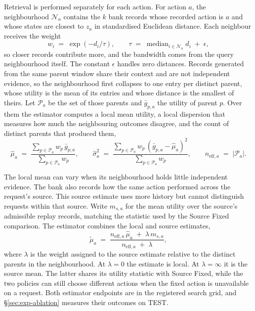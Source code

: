 \documentclass{article}
\newcommand{\calN}{\mathcal{N}}
\newcommand{\calP}{\mathcal{P}}
\begin{document}
Retrieval is performed separately for each action. For action $a$, the neighbourhood
$\calN_a$ contains the $k$ bank records whose recorded action is $a$ and whose states are
closest to $z_a$ in standardised Euclidean distance. Each neighbour receives the weight
\begin{equation}
  w_i \;=\; \exp\!\left(-d_i / \tau\right),
  \qquad
  \tau \;=\; \operatorname{median}_{i \in \calN_a} d_i \;+\; \epsilon ,
  \label{eq:weights}
\end{equation}
so closer records contribute more, and the bandwidth comes from the query neighbourhood
itself. The constant $\epsilon$ handles zero distances. Records generated from the same
parent window share their context and are not independent evidence, so the neighbourhood
first collapses to one entry per distinct parent, whose utility is the mean of its entries and
whose distance is the smallest of theirs. Let $\calP_a$ be the set of those parents and
$\bar g_{p,a}$ the utility of parent $p$. Over them the estimator computes a local mean
utility, a local dispersion that measures how much the neighbouring outcomes disagree, and the
count of distinct parents that produced them,
\begin{equation}
  \hat\mu_a \;=\; \frac{\sum_{p \in \calP_a} w_p\, \bar g_{p,a}}{\sum_{p \in \calP_a} w_p},
  \qquad
  \hat\sigma_a^{2} \;=\; \frac{\sum_{p \in \calP_a} w_p\, (\bar g_{p,a} - \hat\mu_a)^{2}}{\sum_{p \in \calP_a} w_p},
  \qquad
  n_{\mathrm{eff},a} \;=\; \left| \calP_a \right| .
  \label{eq:local-moments}
\end{equation}

The local mean can vary when its neighbourhood holds little independent evidence. The bank
also records how the same action performed across the request's source. This source estimate
uses more history but cannot distinguish requests within that source. Write $m_{s,a}$ for the
mean utility over the source's admissible replay records, matching the statistic used by the
Source Fixed comparison. The estimator combines the local and source estimates,
\begin{equation}
  \tilde\mu_a \;=\; \frac{n_{\mathrm{eff},a}\,\hat\mu_a \;+\; \lambda\, m_{s,a}}
                          {n_{\mathrm{eff},a} \;+\; \lambda} ,
  \label{eq:pooled}
\end{equation}
where $\lambda$ is the weight assigned to the source estimate relative to the distinct
parents in the neighbourhood. At $\lambda=0$ the estimate is local. At
$\lambda=\infty$ it is the source mean. The latter shares its utility statistic with
Source Fixed, while the two policies can still choose different actions when the fixed
action is unavailable on a request. Both estimator endpoints are in the registered search
grid, and \S\ref{sec:exp-ablation} measures their outcomes on TEST.
\end{document}
